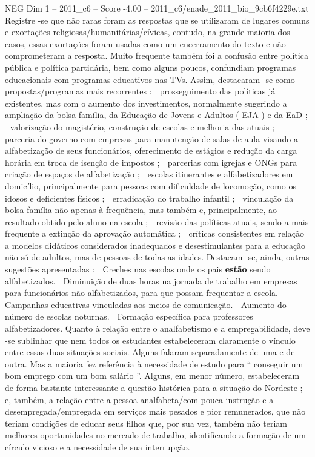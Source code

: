 \begin{textsample}{NEG Dim 1 – 2011\_c6 – Score -4.00 – 2011\_c6/enade\_2011\_bio\_9cb6f4229e.txt}
Registre -se que não raras foram as respostas que se utilizaram de lugares comuns e exortações religiosas/humanitárias/cívicas, contudo, na grande maioria dos casos, essas exortações foram usadas como um encerramento do texto e não comprometeram a resposta.
Muito frequente também foi a confusão entre política pública e política partidária, bem como alguns poucos, confundiam programas educacionais com programas educativos nas TVs.
Assim, destacaram -se como propostas/programas mais recorrentes :  prosseguimento das políticas já existentes, mas com o aumento dos investimentos, normalmente sugerindo a ampliação da bolsa família, da Educação de Jovens e Adultos ( EJA ) e da EaD ;  valorização do magistério, construção de escolas e melhoria das atuais ;  parceria do governo com empresas para manutenção de salas de aula visando a alfabetização de seus funcionários, oferecimento de estágios e redução da carga horária em troca de isenção de impostos ;  parcerias com igrejas e ONGs para criação de espaços de alfabetização ;  escolas itinerantes e alfabetizadores em domicílio, principalmente para pessoas com dificuldade de locomoção, como os idosos e deficientes físicos ;  erradicação do trabalho infantil ;  vinculação da bolsa família não apenas à frequência, mas também e, principalmente, ao resultado obtido pelo aluno na escola ;  revisão das políticas atuais, sendo a mais frequente a extinção da aprovação automática ;  críticas consistentes em relação a modelos didáticos considerados inadequados e desestimulantes para a educação não só de adultos, mas de pessoas de todas as idades.
Destacam -se, ainda, outras sugestões apresentadas :  Creches nas escolas onde os pais \textbf{estão} sendo alfabetizados.  Diminuição de duas horas na jornada de trabalho em empresas para funcionários não alfabetizados, para que possam frequentar a escola.  Campanhas educativas vinculadas aos meios de comunicação.  Aumento do número de escolas noturnas.  Formação específica para professores alfabetizadores.
Quanto à relação entre o analfabetismo e a empregabilidade, deve -se sublinhar que nem todos os estudantes estabeleceram claramente o vínculo entre essas duas situações sociais.
Alguns falaram separadamente de uma e de outra.
Mas a maioria fez referência à necessidade de estudo para “ conseguir um bom emprego com um bom salário ”.
Alguns, em menor número, estabeleceram de forma bastante interessante a questão histórica para a situação do Nordeste ; e, também, a relação entre a pessoa analfabeta/com pouca instrução e a desempregada/empregada em serviços mais pesados e pior remunerados, que não teriam condições de educar seus filhos que, por sua vez, também não teriam melhores oportunidades no mercado de trabalho, identificando a formação de um círculo vicioso e a necessidade de sua interrupção.

\end{textsample}
